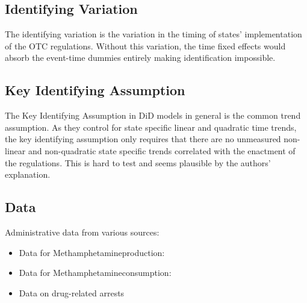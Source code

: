 \documentclass[%
  fontsize=11pt, %
  version=last,%
  headsepline,
  titlepage = false,
  DIV = 11, %
  abstract = false
]{scrartcl}
\newcommand{\meth}{Methamphetamine} %
\begin{document}
\subsection*{Identifying Variation}
The identifying variation is the variation in the timing of states' implementation of the OTC regulations. Without this variation, the time fixed effects would absorb the event-time dummies entirely making identification impossible. 

\subsection*{Key Identifying Assumption}
The Key Identifying Assumption in DiD models in general is the common trend assumption. As they control for state specific linear and quadratic time trends, the key identifying assumption only requires that there are no unmeasured non-linear and non-quadratic state specific trends correlated with the enactment of the regulations. This is hard to test and seems plausible by the authors' explanation.

\subsection*{Data}
Administrative data from various sources:
\begin{itemize}
	\item Data for \meth production:
	\item Data for \meth consumption:
	\item Data on drug-related arrests
\end{itemize}
\end{document}
